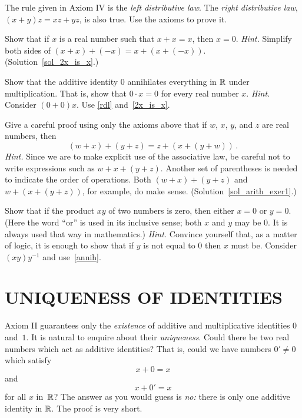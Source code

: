 \begin{prob}\label{rdl} The rule given in Axiom IV is the
\emph{left distributive law}.  The
\emph{right distributive law}, $(x + y)z = xz + yz$, is also true. Use the axioms to prove it.
\end{prob}

\begin{exer}\label{2x_is_x} Show that if $x$ is a real number such that $x + x = x$, then $x = 0$.
\emph{Hint.} Simplify both sides of $(x+x)+(-x) = x+(x+(-x))$. (Solution~\ref{sol_2x_is_x}.)
\end{exer}

\begin{prob}\label{annih} Show that the additive identity $0$ annihilates everything in $\mathbb{R}$
under multiplication.  That is, show that $0 \cdot x = 0$ for every real number $x$.
\emph{Hint.} Consider $(0 + 0)x$. Use \ref{rdl} and~\ref{2x_is_x}.
\end{prob}

\begin{exer}\label{arith_exer1} Give a careful proof using only the axioms above that if $w$,
$x$, $y$, and $z$ are real numbers, then
  \[ (w + x) + (y + z) = z + (x + (y + w))\,. \]
\emph{Hint.}  Since we are to make explicit use of the associative law, be careful not to
write expressions such as $w + x + (y + z)$. Another set of parentheses is needed to indicate
the order of operations.  Both $(w + x) + (y + z)$ and $w + (x + (y + z))$, for example, do
make sense.  (Solution~\ref{sol_arith_exer1}.)

\end{exer}

\begin{prob}\label{prob_zero_prod} Show that if the product $xy$ of two numbers is zero, then
either $x = 0$ or $y = 0$.  (Here the word ``or'' is used in its inclusive sense; both $x$ and
$y$ may be $0$.  It is always used that way in mathematics.) \emph{Hint.} Convince yourself
that, as a matter of logic, it is enough to show that if $y$ is not equal to $0$ then $x$ must
be. Consider $(xy)y^{-1}$ and use~\ref{annih}.
\end{prob}







\section{UNIQUENESS OF IDENTITIES}  Axiom II guarantees only the \emph{existence} of additive
and multiplicative identities $0$ and~$1$.  It is natural to enquire about their
\emph{uniqueness}. Could there be two real numbers which act as additive identities? That is,
could we have numbers $0' \ne 0$ which satisfy
 \begin{equation}\label{arith_eqn1} x + 0 = x
 \end{equation}
and
 \begin{equation}\label{arith_eqn1'} x + 0' = x
 \end{equation}
for all $x$ in~$\mathbb{R}$?  The answer as you would guess is \emph{no:} there is only one additive
identity in $\mathbb{R}$. The proof is very short.

